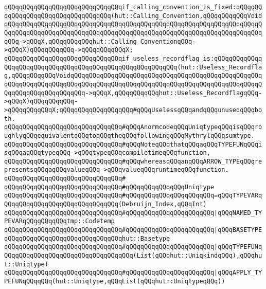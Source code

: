 \verb|qQQqqQQqqQQqqQQqqQQqqQQqqQQqqQQqif_calling_convention_is_fixed:qQQqqQQqqQQqqQQqqQQqqQQqqQQqqQQqqQQq(hut::Calling_Convention,qQQqqQQqqQQqVoidqQQqqQQqqQQqqQQqqQQqqQQqqQQqqQQqqQQqqQQqqQQqqQQqqQQqqQQqqQQqqQQqqQQqqQQqqQQqqQQqqQQqqQQqqQQqqQQqqQQqqQQqqQQqqQQqqQQqqQQqqQQqqQQqqQQqqQQqqQQqqQQq->qQQqX,qQQqqQQqqQQqhut::Calling_ConventionqQQq->qQQqX)qQQqqQQqqQQq->qQQqqQQqqQQqX;|\newline
\verb|qQQqqQQqqQQqqQQqqQQqqQQqqQQqqQQqif_useless_recordflag_is:qQQqqQQqqQQqqQQqqQQqqQQqqQQqqQQqqQQqqQQqqQQqqQQqqQQqqQQqqQQq(hut::Useless_Recordflag,qQQqqQQqqQQqVoidqQQqqQQqqQQqqQQqqQQqqQQqqQQqqQQqqQQqqQQqqQQqqQQqqQQqqQQqqQQqqQQqqQQqqQQqqQQqqQQqqQQqqQQqqQQqqQQqqQQqqQQqqQQqqQQqqQQqqQQqqQQqqQQqqQQqqQQqqQQqqQQq->qQQqX,qQQqqQQqqQQqhut::Useless_RecordflagqQQq->qQQqX)qQQqqQQqqQQq->qQQqqQQqqQQqX;qQQqqQQqqQQqqQQqqQQq#qQQqUselessqQQqandqQQqunusedqQQqboth.|\newline
\newline
\newline
\verb|qQQqqQQqqQQqqQQqqQQqqQQqqQQqqQQq#qQQqAnormcodeqQQqUniqtypeqQQqisqQQqroughlyqQQqequivalentqQQqtoqQQqtheqQQqfollowingqQQqMythrylqQQqsumtype.|\newline
\verb|qQQqqQQqqQQqqQQqqQQqqQQqqQQqqQQq#qQQqNoteqQQqthatqQQqaqQQqTYPEFUNqQQqisqQQqaqQQqtypeqQQq->qQQqtypeqQQqcompiletimeqQQqfunction,|\newline
\verb|qQQqqQQqqQQqqQQqqQQqqQQqqQQqqQQq#qQQqwhereasqQQqanqQQqARROW_TYPEqQQqrepresentsqQQqaqQQqvalueqQQq->qQQqvalueqQQqruntimeqQQqfunction.|\newline
\verb|qQQqqQQqqQQqqQQqqQQqqQQqqQQqqQQq#|\newline
\verb|qQQqqQQqqQQqqQQqqQQqqQQqqQQqqQQq#qQQqqQQqqQQqqQQqUniqtype|\newline
\verb|qQQqqQQqqQQqqQQqqQQqqQQqqQQqqQQq#qQQqqQQqqQQqqQQqqQQqqQQq=qQQqTYPEVARqQQqqQQqqQQqqQQqqQQqqQQqqQQqqQQq(Debruijn_Index,qQQqInt)|\newline
\verb|qQQqqQQqqQQqqQQqqQQqqQQqqQQqqQQq#qQQqqQQqqQQqqQQqqQQqqQQq|\verb#|qQQqNAMED_TYPEVARqQQqqQQqqQQqtmp::Codetemp#\newline
\verb|qQQqqQQqqQQqqQQqqQQqqQQqqQQqqQQq#qQQqqQQqqQQqqQQqqQQqqQQq|\verb#|qQQqBASETYPEqQQqqQQqqQQqqQQqqQQqqQQqqQQqqQQqhut::Basetype#\newline
\verb|qQQqqQQqqQQqqQQqqQQqqQQqqQQqqQQq#qQQqqQQqqQQqqQQqqQQqqQQq|\verb#|qQQqTYPEFUNqQQqqQQqqQQqqQQqqQQqqQQqqQQqqQQqqQQq(List(qQQqhut::UniqkindqQQq),qQQqhut::Uniqtype)#\newline
\verb|qQQqqQQqqQQqqQQqqQQqqQQqqQQqqQQq#qQQqqQQqqQQqqQQqqQQqqQQq|\verb#|qQQqAPPLY_TYPEFUNqQQqqQQq(hut::Uniqtype,qQQqList(qQQqhut::UniqtypeqQQq))#\newline
